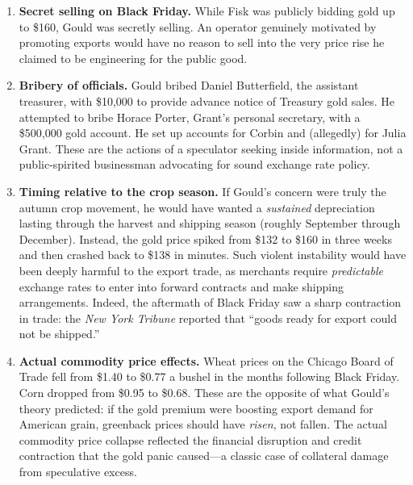 \documentclass[12pt]{article}
\begin{document}
\begin{enumerate}
    \item \textbf{Secret selling on Black Friday.} While Fisk was 
    publicly bidding gold up to \$160, Gould was secretly selling. An 
    operator genuinely motivated by promoting exports would have no 
    reason to sell into the very price rise he claimed to be engineering 
    for the public good.
    
    \item \textbf{Bribery of officials.} Gould bribed Daniel 
    Butterfield, the assistant treasurer, with \$10,000 to provide 
    advance notice of Treasury gold sales. He attempted to bribe 
    Horace Porter, Grant's personal secretary, with a \$500,000 gold 
    account. He set up accounts for Corbin and (allegedly) for Julia 
    Grant. These are the actions of a speculator seeking inside 
    information, not a public-spirited businessman advocating for 
    sound exchange rate policy.
    
    \item \textbf{Timing relative to the crop season.} If Gould's 
    concern were truly the autumn crop movement, he would have wanted a 
    \emph{sustained} depreciation lasting through the harvest and 
    shipping season (roughly September through December). Instead, the 
    gold price spiked from \$132 to \$160 in three weeks and then 
    crashed back to \$138 in minutes. Such violent instability would 
    have been deeply harmful to the export trade, as merchants require 
    \emph{predictable} exchange rates to enter into forward contracts 
    and make shipping arrangements. Indeed, the aftermath of Black 
    Friday saw a sharp contraction in trade: the \emph{New York 
    Tribune} reported that ``goods ready for export could not be 
    shipped.''
    
    \item \textbf{Actual commodity price effects.} Wheat prices on the 
    Chicago Board of Trade fell from \$1.40 to \$0.77 a bushel in the 
    months following Black Friday. Corn dropped from \$0.95 to \$0.68. 
    These are the opposite of what Gould's theory predicted: if the 
    gold premium were boosting export demand for American grain, 
    greenback prices should have \emph{risen}, not fallen. The actual 
    commodity price collapse reflected the financial disruption and 
    credit contraction that the gold panic caused---a classic case of 
    collateral damage from speculative excess.
\end{enumerate}
\end{document}
